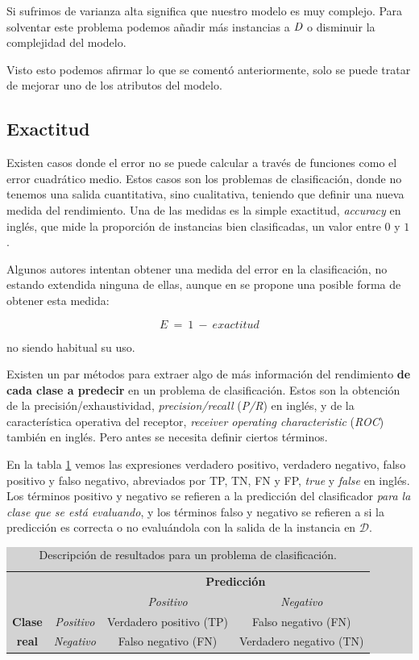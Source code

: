 Si sufrimos de varianza alta significa que nuestro modelo es muy complejo. Para solventar este problema podemos añadir más instancias a $\emph{D}$ o disminuir la complejidad del modelo.

Visto esto podemos afirmar lo que se comentó anteriormente, solo se puede tratar de mejorar uno de los atributos del modelo.

\subsection{Exactitud} \label{subsec:3.2.4}

Existen casos donde el error no se puede calcular a través de funciones como el error cuadrático medio. Estos casos son los problemas de clasificación, donde no tenemos una salida cuantitativa, sino cualitativa, teniendo que definir una nueva medida del rendimiento. Una de las medidas es la simple exactitud, \emph{accuracy} en inglés, que mide la proporción de instancias bien clasificadas, un valor entre $0$ y $1$.

Algunos autores intentan obtener una medida del error en la clasificación, no estando extendida ninguna de ellas, aunque en \cite{richert2013building} se propone una posible forma de obtener esta medida:

$$
E\:=\:1\:-\:exactitud
$$

\noindent
no siendo habitual su uso.

Existen un par métodos para extraer algo de más información del rendimiento \textbf{de cada clase a predecir} en un problema de clasificación. Estos son la obtención de la precisión/exhaustividad, \emph{precision/recall} (\emph{P/R}) en inglés, y de la característica operativa del receptor, \emph{receiver operating characteristic} (\emph{ROC}) también en inglés. Pero antes se necesita definir ciertos términos.

En la tabla \ref{table:3.2} vemos las expresiones verdadero positivo, verdadero negativo, falso positivo y falso negativo, abreviados por TP, TN, FN y FP, \emph{true} y \emph{false} en inglés. Los términos positivo y negativo se refieren a la predicción del clasificador \emph{para la clase que se está evaluando}, y los términos falso y negativo se refieren a si la predicción es correcta o no evaluándola con la salida de la instancia en $\mathcal{D}$.

\begin{table}[ht]
\centering
\colorbox{lightgray}{\begin{tabular}{*{4}{c}}
  & & \multicolumn{2}{c}{\textbf{Predicción}} \\
  & & \textit{Positivo} & \textit{Negativo} \\
  \textbf{Clase} & \textit{Positivo} & Verdadero positivo (TP) & Falso negativo (FN) \\
  \textbf{real} & \textit{Negativo} & Falso negativo (FN) & Verdadero negativo (TN)
\end{tabular}}
\caption{Descripción de resultados para un problema de clasificación.}
\label{table:3.2}
\end{table}

